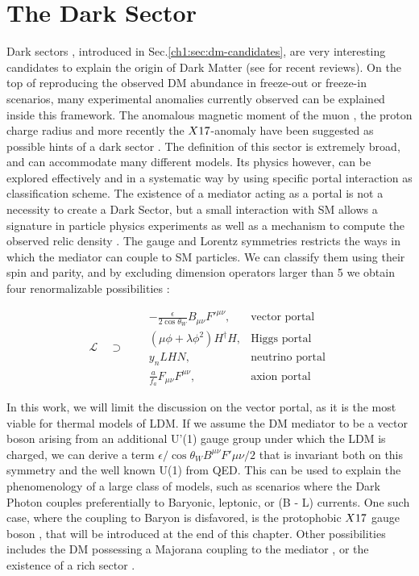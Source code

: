 \section{The Dark Sector}
\label{ch1:sec:dm-sector}

Dark sectors , introduced in Sec.\ref{ch1:sec:dm-candidates}, are very interesting candidates to explain the origin of Dark Matter (see \cite{battaglieri2017cosmic,alex2016dark} for recent reviews). On the top of reproducing the observed DM abundance in freeze-out or freeze-in scenarios, many experimental anomalies currently observed can be explained inside this framework. The anomalous magnetic moment of the muon \cite{blum2013muon}, the proton charge radius \cite{Pohl2010} and more recently the $X17$-anomaly \cite{Krasznahorkay:2015iga,Krasznahorkay:2019lyl} have been suggested as possible hints of a dark sector \cite{alex2016dark}. The definition of this sector is extremely broad, and can accommodate many different models. Its physics however, can be explored effectively and in a systematic way by using specific portal interaction as classification scheme.  The existence of a mediator acting as a portal is not a necessity to create a Dark Sector, but a small interaction with SM allows a signature in particle physics experiments as well as a mechanism to compute the observed relic density \cite{prw, pospelov}. The gauge and Lorentz symmetries restricts the ways in which the mediator can couple to SM particles. We can classify them using their spin and parity, and by excluding dimension operators larger than 5 we obtain four renormalizable possibilities \cite{alex2016dark}:

\begin{equation}
  \label{eq:dm-portals}
  \mathcal{L} \quad \supset \quad
\begin{aligned}
  &-\frac{\epsilon}{2 \cos{\theta_W}}B_{\mu \nu}F'^{\mu \nu}, &\textrm{vector portal}\\
  & (\mu \phi + \lambda \phi^2)H^{\dagger}H, &\textrm{Higgs portal}\\
  &y_n LHN, &\textrm{neutrino portal} \\
  &\frac{a}{f_a} F_{\mu \nu} F^{\mu \nu}, &\textrm{axion portal}
\end{aligned}
\end{equation}

In this work, we will limit the discussion on the vector portal, as it is the most viable for thermal models of LDM. If we assume the DM mediator to be a vector boson arising from an additional U'(1) gauge group under which the LDM is charged, we can derive a term $\epsilon / \cos{\theta_W} B^{\mu \nu} F'{\mu \nu}/2$ that is invariant both on this symmetry and the well known U(1) from QED. This can be used to explain the phenomenology of a large class of models, such as scenarios where the Dark Photon couples preferentially to Baryonic, leptonic, or (B - L) currents. One such case, where the coupling to Baryon is disfavored, is the protophobic $X17$ gauge boson \cite{PhysRevD.95.035017}, that will be introduced at the end of this chapter. Other possibilities includes the DM possessing a Majorana coupling to the mediator \cite{PhysRevD.93.063523}, or the existence of a rich sector \cite{Morrissey_2014}.

